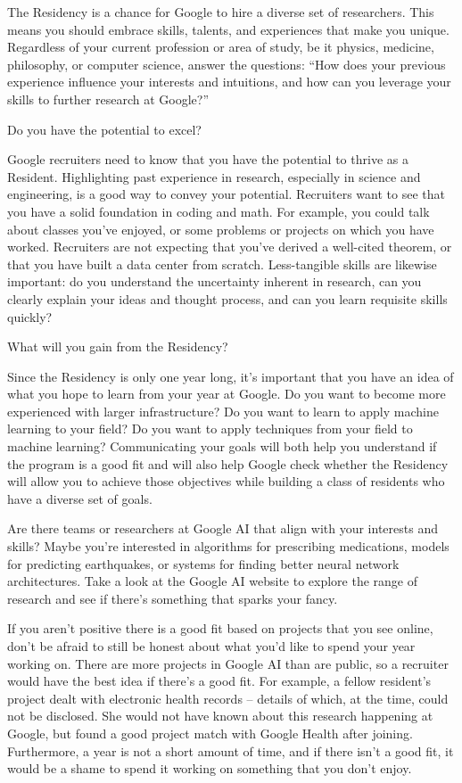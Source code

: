 \documentclass[letterpaper,10pt]{article}
\begin{document}
The Residency is a chance for Google to hire a diverse set of researchers. This means you should embrace skills, talents, and experiences that make you unique. Regardless of your current profession or area of study, be it physics, medicine, philosophy, or computer science, answer the questions: “How does your previous experience influence your interests and intuitions, and how can you leverage your skills to further research at Google?”

Do you have the potential to excel?

Google recruiters need to know that you have the potential to thrive as a Resident. Highlighting past experience in research, especially in science and engineering, is a good way to convey your potential. Recruiters want to see that you have a solid foundation in coding and math. For example, you could talk about classes you've enjoyed, or some problems or projects on which you have worked. Recruiters are not expecting that you've derived a well-cited theorem, or that you have built a data center from scratch. Less-tangible skills are likewise important: do you understand the uncertainty inherent in research, can you clearly explain your ideas and thought process, and can you learn requisite skills quickly?

What will you gain from the Residency?

Since the Residency is only one year long, it's important that you have an idea of what you hope to learn from your year at Google. Do you want to become more experienced with larger infrastructure? Do you want to learn to apply machine learning to your field? Do you want to apply techniques from your field to machine learning? Communicating your goals will both help you understand if the program is a good fit and will also help Google check whether the Residency will allow you to achieve those objectives while building a class of residents who have a diverse set of goals. 

 Are there teams or researchers at Google AI that align with your interests and skills? Maybe you're interested in algorithms for prescribing medications, models for predicting earthquakes, or systems for finding better neural network architectures. Take a look at the Google AI website to explore the range of research and see if there’s something that sparks your fancy.

If you aren’t positive there is a good fit based on projects that you see online, don’t be afraid to still be honest about what you’d like to spend your year working on. There are more projects in Google AI than are public, so a recruiter would have the best idea if there’s a good fit. For example, a fellow resident’s project dealt with electronic health records – details of which, at the time, could not be disclosed. She would not have known about this research happening at Google, but found a good project match with Google Health after joining. Furthermore, a year is not a short amount of time, and if there isn’t a good fit, it would be a shame to spend it working on something that you don’t enjoy.
\end{document}

